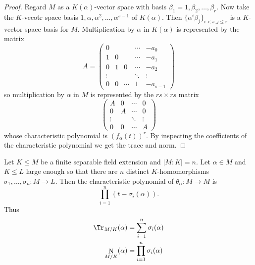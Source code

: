\documentclass[a4paper]{article}
\DeclareMathOperator{\n}{N}
\begin{document}
\begin{proof}
  Regard \(M\) as a \(K(\alpha)\)-vector space with basis \(\beta_1 = 1, \beta_2, \dots, \beta_r\). Now take the \(K\)-vecotr space basis \(1, \alpha, \alpha^2, \dots, \alpha^{s - 1}\) of \(K(\alpha)\). Then \(\{\alpha^i \beta_j\}_{i < s, j \leq r}\) is a \(K\)-vector space basis for \(M\). Multiplication by \(\alpha\) in \(K(\alpha)\) is represented by the matrix
    \[
      A =
      \begin{pmatrix}
        0 & & & \cdots & -a_0 \\
        1 & 0 & & \cdots & -a_1 \\
        0 & 1 & 0 & \cdots & -a_2 \\
        \vdots & & & \ddots & \vdots \\
        0 & 0 & \cdots & 1 & -a_{s - 1}
      \end{pmatrix}
    \]
    so multiplication by \(\alpha\) in \(M\) is represented by the \(rs \times rs\) matrix
    \[
      \begin{pmatrix}
        A & 0 & \cdots & 0 \\
        0 & A & \cdots & 0 \\
        \vdots & & \ddots & \vdots \\
        0 & 0 & \cdots & A
      \end{pmatrix}
    \]
    whose characteristic polynomial is \((f_\alpha(t))^r\). By inspecting the coefficients of the characteristic polynomial we get the trace and norm.
\end{proof}

\begin{theorem}
  \label{thm:trace and norm of separable extension}
  Let \(K \leq M\) be a finite separable field extension and \(|M:K| = n\). Let \(\alpha \in M\) and \(K \leq L\) large enough so that there are \(n\) distinct \(K\)-homomorphisms \(\sigma_1, \dots, \sigma_n: M \to L\). Then the characteristic polynomial of \(\theta_\alpha: M \to M\) is
  \[
    \prod_{i = 1}^{n}(t - \sigma_i(\alpha)).
  \]
  Thus
  \begin{align*}
    \Tr_{M/K}(\alpha) &= \sum_{i = 1}^{n} \sigma_i(\alpha) \\
    \n_{M/K}(\alpha) &= \prod_{i = 1}^{n} \sigma_i(\alpha)
  \end{align*}
\end{theorem}
\end{document}
